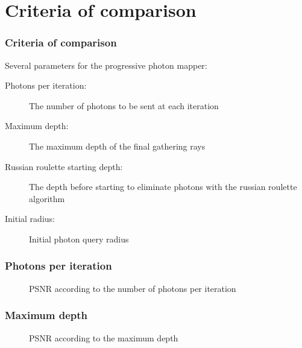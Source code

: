 \documentclass{beamer}
\begin{document}
\section{Criteria of comparison}
\begin{frame}
    \frametitle{Criteria of comparison}
    Several parameters for the progressive photon mapper:
    \begin{description}
        \item[Photons per iteration:] The number of photons to be sent at each iteration
        \item[Maximum depth:] The maximum depth of the final gathering rays
        \item[Russian roulette starting depth:] The depth before starting to eliminate photons with the russian roulette algorithm
        \item[Initial radius:] Initial photon query radius
    \end{description}
\end{frame}
\begin{frame}
    \frametitle{Photons per iteration}
    \begin{minipage}{0.5\textwidth}
    \end{minipage}
    \begin{minipage}{\textwidth}
    \begin{figure}
        \centering
        \caption{PSNR according to the number of photons per iteration}
    \end{figure}
    \end{minipage}
\end{frame}
\begin{frame}
    \frametitle{Maximum depth}
    \begin{minipage}{0.5\textwidth}
    \end{minipage}
    \begin{minipage}{\textwidth}
    \begin{figure}
        \centering
        \caption{PSNR according to the maximum depth}
    \end{figure}
    \end{minipage}
\end{frame}
\end{document}

